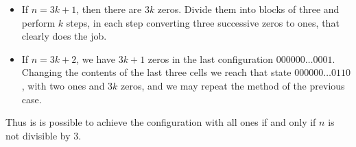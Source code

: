 \documentclass{article}
\begin{document}
\begin{enumerate}
{\begin{itemize}
\begin{itemize}

\item If $n = 3k + 1$, then there are $3k$ zeros. Divide them into blocks of three and perform $k$ steps, in each step converting three successive zeros to ones, that clearly does the job.

\item If $n = 3k + 2$, we have $3k + 1$ zeros in the last configuration $000000 \dots 0001$. Changing the contents of the last three cells we reach that state $000000 \dots 0110$, with two ones and $3k$ zeros, and we may repeat the method of the previous case.

\end{itemize}

Thus is is possible to achieve the configuration with all ones if and only if $n$ is not divisible by $3$.

\end{itemize}
}

\end{enumerate}
\end{document}
